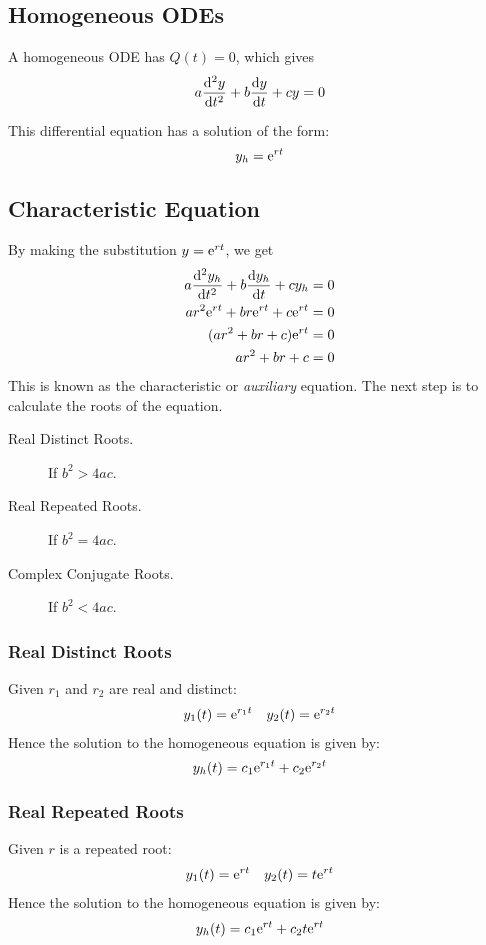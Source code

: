 \documentclass{article}
\begin{document}
\subsection{Homogeneous ODEs}
\begin{definition}
    A homogeneous ODE has $Q(t)=0$, which gives
    \begin{equation*}
        a \dv[2]{y}{t} + b \dv{y}{t} + c y = 0
    \end{equation*} 
\end{definition}
This differential equation has a solution of the form:
\begin{equation*}
    y_h = \mathrm{e}^{rt}
\end{equation*}
\subsection{Characteristic Equation}
By making the substitution $y=\mathrm{e}^{rt}$, we get
\begin{align*}
    a \dv[2]{y_h}{t} + b \dv{y_h}{t} + c y_h &= 0 \\
    ar^2\mathrm{e}^{rt} + br\mathrm{e}^{rt} + c\mathrm{e}^{rt} &= 0 \\
    (ar^2 + br + c)\mathrm{e}^{rt} &= 0 \\
    ar^2 + br + c &= 0
\end{align*}
This is known as the characteristic or \textit{auxiliary} equation. The next step is to calculate the roots of the equation.
\begin{description}
    \item[Real Distinct Roots.] If $b^2 > 4ac$.
    \item[Real Repeated Roots.] If $b^2 = 4ac$.
    \item[Complex Conjugate Roots.] If $b^2 < 4ac$.
\end{description}
\subsubsection{Real Distinct Roots}
Given $r_1$ and $r_2$ are real and distinct:
\begin{align*}
    y_1(t) = \mathrm{e}^{r_1t} & & y_2(t) = \mathrm{e}^{r_2t}
\end{align*}
Hence the solution to the homogeneous equation is given by:
\begin{equation*}
    y_h(t) = c_1\mathrm{e}^{r_1t} + c_2\mathrm{e}^{r_2t}
\end{equation*}
\subsubsection{Real Repeated Roots}
Given $r$ is a repeated root:
\begin{align*}
    y_1(t) = \mathrm{e}^{rt} & & y_2(t) = t\mathrm{e}^{rt}
\end{align*}
Hence the solution to the homogeneous equation is given by:
\begin{equation*}
    y_h(t) = c_1\mathrm{e}^{rt} + c_2t\mathrm{e}^{rt}
\end{equation*}
\end{document}
